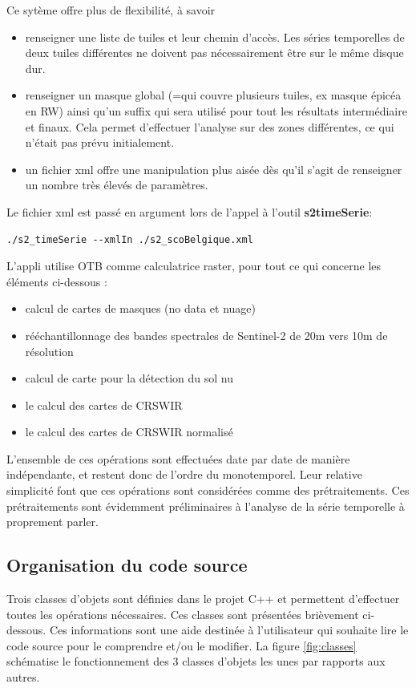 \documentclass[a4paper, 12pt]{article} %
\begin{document}
Ce sytème offre plus de flexibilité, à savoir
\begin{itemize}
	\item renseigner une liste de tuiles et leur chemin d'accès. Les séries temporelles de deux tuiles différentes ne doivent pas nécessairement être sur le même disque dur.
	\item renseigner un masque global (=qui couvre plusieurs tuiles, ex masque épicéa en RW) ainsi qu'un suffix qui sera utilisé pour tout les résultats intermédiaire et finaux. Cela permet d'effectuer l'analyse sur des zones différentes, ce qui n'était pas prévu initialement.
	\item un fichier xml offre une manipulation plus aisée dès qu'il s'agit de renseigner un nombre très élevés de paramètres.
\end{itemize}

Le fichier xml est passé en argument lors de l'appel à l'outil \textbf{s2{\textunderscore}timeSerie}:
\begin{lstlisting}
./s2_timeSerie --xmlIn ./s2_scoBelgique.xml 
\end{lstlisting}

L'appli utilise OTB comme calculatrice raster, pour tout ce qui concerne les éléments ci-dessous :
\begin{itemize}
	\item calcul de cartes de masques (no data et nuage)
	\item rééchantillonnage des bandes spectrales de Sentinel-2 de 20m vers 10m de résolution
	\item calcul de carte pour la détection du sol nu
	\item le calcul des cartes de CRSWIR
	\item le calcul des cartes de CRSWIR normalisé
\end{itemize}

L'ensemble de ces opérations sont effectuées date par date de manière indépendante, et restent donc de l'ordre du monotemporel. Leur relative simplicité font que ces opérations sont considérées comme des prétraitements. Ces prétraitements sont évidemment préliminaires à l'analyse de la série temporelle à proprement parler.
 
\subsection{Organisation du code source}

Trois classes d'objets sont définies dans le projet C++ et permettent d'effectuer toutes les opérations nécessaires. Ces classes sont présentées brièvement ci-dessous. Ces informations sont une aide destinée à l'utilisateur qui souhaite lire le code source pour le comprendre et/ou le modifier. La figure \ref{fig:classes} schématise le fonctionnement des 3 classes d'objets les unes par rapports aux autres.
\end{document}
